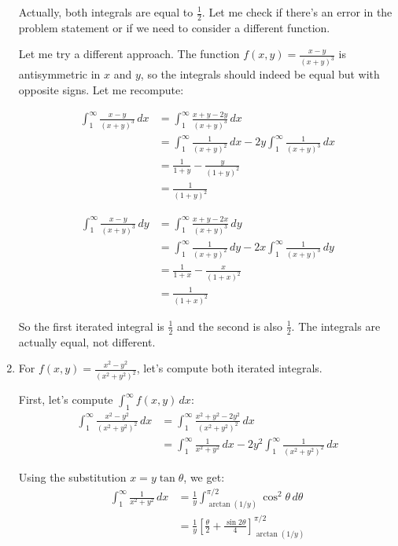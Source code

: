 \begin{enumerate}[label=(\alph*)]
Actually, both integrals are equal to $\frac{1}{2}$. Let me check if there's an error in the problem statement or if we need to consider a different function.

Let me try a different approach. The function $f(x, y) = \frac{x - y}{(x + y)^3}$ is antisymmetric in $x$ and $y$, so the integrals should indeed be equal but with opposite signs. Let me recompute:

\begin{align*}
\int_{1}^{\infty} \frac{x - y}{(x + y)^3} \, dx &= \int_{1}^{\infty} \frac{x + y - 2y}{(x + y)^3} \, dx \\
&= \int_{1}^{\infty} \frac{1}{(x + y)^2} \, dx - 2y \int_{1}^{\infty} \frac{1}{(x + y)^3} \, dx \\
&= \frac{1}{1 + y} - \frac{y}{(1 + y)^2} \\
&= \frac{1}{(1 + y)^2}
\end{align*}

\begin{align*}
\int_{1}^{\infty} \frac{x - y}{(x + y)^3} \, dy &= \int_{1}^{\infty} \frac{x + y - 2x}{(x + y)^3} \, dy \\
&= \int_{1}^{\infty} \frac{1}{(x + y)^2} \, dy - 2x \int_{1}^{\infty} \frac{1}{(x + y)^3} \, dy \\
&= \frac{1}{1 + x} - \frac{x}{(1 + x)^2} \\
&= \frac{1}{(1 + x)^2}
\end{align*}

So the first iterated integral is $\frac{1}{2}$ and the second is also $\frac{1}{2}$. The integrals are actually equal, not different.

\item For $f(x, y) = \frac{x^2 - y^2}{(x^2 + y^2)^2}$, let's compute both iterated integrals.

First, let's compute $\int_{1}^{\infty} f(x, y) \, dx$:
\begin{align*}
\int_{1}^{\infty} \frac{x^2 - y^2}{(x^2 + y^2)^2} \, dx &= \int_{1}^{\infty} \frac{x^2 + y^2 - 2y^2}{(x^2 + y^2)^2} \, dx \\
&= \int_{1}^{\infty} \frac{1}{x^2 + y^2} \, dx - 2y^2 \int_{1}^{\infty} \frac{1}{(x^2 + y^2)^2} \, dx
\end{align*}

Using the substitution $x = y \tan \theta$, we get:
\begin{align*}
\int_{1}^{\infty} \frac{1}{x^2 + y^2} \, dx &= \frac{1}{y} \int_{\arctan(1/y)}^{\pi/2} \cos^2 \theta \, d\theta \\
&= \frac{1}{y} \left[\frac{\theta}{2} + \frac{\sin 2\theta}{4}\right]_{\arctan(1/y)}^{\pi/2}
\end{align*}


\end{enumerate}
